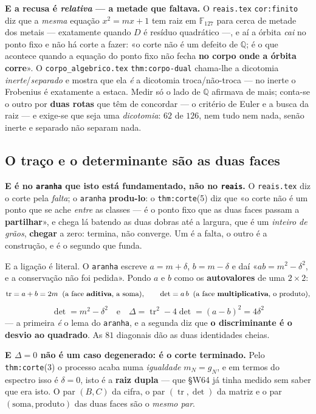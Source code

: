 \documentclass[11pt,a4paper]{article}
\newcommand{\code}[1]{\texttt{\small #1}}
\begin{document}
\medskip\noindent\textbf{E a recusa é \emph{relativa} --- a metade que faltava.} O
\code{reais.tex} \code{cor:finito} diz que a \emph{mesma} equação $x^{2}=mx+1$ tem
raiz em $\mathbb{F}_{127}$ para cerca de metade dos metais --- exatamente quando $D$ é
resíduo quadrático ---, e aí a órbita \emph{cai} no ponto fixo e não há corte a
fazer: «o corte não é um defeito de $\mathbb{Q}$; é o que acontece quando a equação
do ponto fixo não fecha \textbf{no corpo onde a órbita corre}». O
\code{corpo\_algebrico.tex} \code{thm:corpo-dual} chama-lhe a dicotomia
\emph{inerte}/\emph{separado} e mostra que ela \emph{é} a dicotomia troca/não-troca
--- no inerte o Frobenius é exatamente a estaca. Medir só o lado de $\mathbb{Q}$
afirmava de mais; conta-se o outro por \textbf{duas rotas} que têm de concordar --- o
critério de Euler e a busca da raiz --- e exige-se que seja uma \emph{dicotomia}:
$62$ de $126$, nem tudo nem nada, senão inerte e separado não separam nada.

\subsection*{O traço e o determinante são as duas faces}

\noindent\textbf{E é no \code{aranha} que isto está fundamentado, não no
\code{reais}.} O \code{reais.tex} diz o corte pela \emph{falta}; o \code{aranha}
\textbf{produ-lo}: o \code{thm:corte}(5) diz que «o corte não é um ponto que se ache
\emph{entre} as classes --- é o ponto fixo que as duas faces passam a
\textbf{partilhar}», e chega lá batendo as duas dobras até a largura, que é um
\emph{inteiro de grãos}, \textbf{chegar} a zero: termina, não converge. Um é a
falta, o outro é a construção, e é o segundo que funda.

\medskip\noindent E a ligação é literal. O \code{aranha} escreve $a=m+\delta$,
$b=m-\delta$ e daí «$ab=m^{2}-\delta^{2}$, e a conservação não foi pedida». Pondo
$a$ e $b$ como os \textbf{autovalores} de uma $2\times2$:
\[
\operatorname{tr}=a+b=2m \;\;(\text{a face \textbf{aditiva}, a soma}),\qquad
\det=a\,b \;\;(\text{a face \textbf{multiplicativa}, o produto}),
\]
\[
\boxed{\;\det=m^{2}-\delta^{2}\quad\text{e}\quad
\Delta=\operatorname{tr}^{2}-4\det=(a-b)^{2}=4\delta^{2}\;}
\]
--- a primeira \emph{é} o lema do \code{aranha}, e a segunda diz que \textbf{o
discriminante é o desvio ao quadrado}. As $81$ diagonais dão as duas identidades
cheias.

\medskip\noindent\textbf{E $\Delta=0$ não é um caso degenerado: é o corte
terminado.} Pelo \code{thm:corte}(3) o processo acaba numa \emph{igualdade}
$m_N=g_N$, e em termos do espectro isso é $\delta=0$, isto é a \textbf{raiz dupla}
--- que §W64 já tinha medido sem saber que era isto. O par $(B,C)$ da cifra, o par
$(\operatorname{tr},\det)$ da matriz e o par $(\text{soma},\text{produto})$ das duas
faces são o \emph{mesmo par}.
\end{document}
